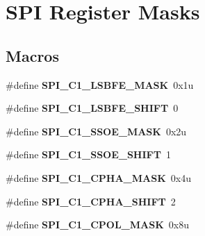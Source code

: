 \hypertarget{group___s_p_i___register___masks}{}\section{S\+PI Register Masks}
\label{group___s_p_i___register___masks}
\subsection*{Macros}
\begin{DoxyCompactItemize}
\item 
\mbox{\label{group___s_p_i___register___masks_ga45f4cb42020607c9ed927bf57cc0ee31}} 
\#define {\bfseries S\+P\+I\+\_\+\+C1\+\_\+\+L\+S\+B\+F\+E\+\_\+\+M\+A\+SK}~0x1u
\item 
\mbox{\label{group___s_p_i___register___masks_gaa81af414d42c393342df48ae8d44c27f}} 
\#define {\bfseries S\+P\+I\+\_\+\+C1\+\_\+\+L\+S\+B\+F\+E\+\_\+\+S\+H\+I\+FT}~0
\item 
\mbox{\label{group___s_p_i___register___masks_ga18d4e12a34e268e98cf29ef47ff46e21}} 
\#define {\bfseries S\+P\+I\+\_\+\+C1\+\_\+\+S\+S\+O\+E\+\_\+\+M\+A\+SK}~0x2u
\item 
\mbox{\label{group___s_p_i___register___masks_gaa5941a1db540652e8da7f3881eb39384}} 
\#define {\bfseries S\+P\+I\+\_\+\+C1\+\_\+\+S\+S\+O\+E\+\_\+\+S\+H\+I\+FT}~1
\item 
\mbox{\label{group___s_p_i___register___masks_gaaf85a831465f0f4f302657b32171f2e6}} 
\#define {\bfseries S\+P\+I\+\_\+\+C1\+\_\+\+C\+P\+H\+A\+\_\+\+M\+A\+SK}~0x4u
\item 
\mbox{\label{group___s_p_i___register___masks_gaa305ee06e9cb66ad7ba9aed297debef3}} 
\#define {\bfseries S\+P\+I\+\_\+\+C1\+\_\+\+C\+P\+H\+A\+\_\+\+S\+H\+I\+FT}~2
\item 
\mbox{\label{group___s_p_i___register___masks_ga8f4bd038e37f3581231f26aafc33c7b1}} 
\#define {\bfseries S\+P\+I\+\_\+\+C1\+\_\+\+C\+P\+O\+L\+\_\+\+M\+A\+SK}~0x8u

\end{DoxyCompactItemize}
